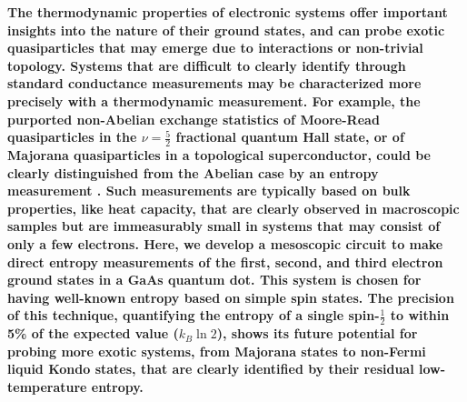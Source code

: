 \documentclass[twocolumn,showpacs,amsmath,amssymb,prl,aps,superscriptaddress]{revtex4-1}
\begin{document}
%
%

\maketitle

\textbf{The thermodynamic properties of electronic systems offer important insights into the nature of their ground states, and can probe exotic quasiparticles that may emerge due to interactions or non-trivial topology.  Systems that are difficult to clearly identify through standard conductance measurements may be characterized more precisely with a thermodynamic measurement. For example, the purported non-Abelian exchange statistics of Moore-Read quasiparticles in the $\nu = \frac{5}{2}$ fractional quantum Hall state, or of Majorana quasiparticles in a topological superconductor, could be clearly distinguished from the Abelian case by an entropy measurement \cite{Cooper2009, Smirnov2015}.  Such measurements are typically based on bulk properties, like heat capacity, that are clearly observed in macroscopic samples but are immeasurably small in systems that may consist of only a few electrons.  Here, we develop a mesoscopic circuit to make direct entropy measurements of the first, second, and third electron ground states in a GaAs quantum dot.  This system is chosen for having well-known entropy based on simple spin states\cite{Tarucha1996, Ciorga2000, Duncan2000, Lindemann2002, Potok2003, Hofmann2016}.  The precision of this technique, quantifying the entropy of a single spin-$\frac{1}{2}$ to within 5\% of the expected value ($k_B \ln{2}$), shows its future potential for probing more exotic systems, from Majorana states to non-Fermi liquid Kondo states, that are clearly identified by their residual low-temperature entropy\cite{Alkurtass2016}.}
\end{document}
